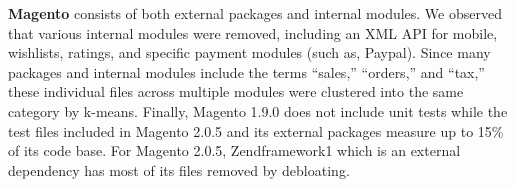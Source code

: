 \vspace{0.5ex}
\noindent\textbf{Magento} consists of both external packages and internal modules. We observed that various internal modules were removed, including an XML API for mobile, wishlists, ratings, and specific payment modules (such as, Paypal). Since many packages and internal modules include the terms ``sales,'' ``orders,'' and ``tax,'' these individual files across multiple modules were clustered into the same category by k-means. Finally, Magento 1.9.0 does not include unit tests while the test files included in Magento 2.0.5 and its external packages measure up to 15\% of its code base. For Magento 2.0.5, Zendframework1 which is an external dependency has most of its files removed by debloating.

\begin{table}[t]
  \centering
  \caption{Verifying exploitability of vulnerabilities by testing exploits against original \& debloated web applications}
  \label{table:metasploit_vulns}
\end{table}

